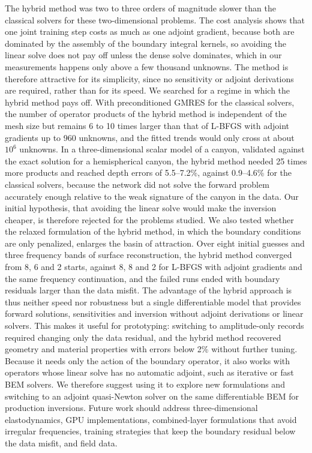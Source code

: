 \documentclass[11pt,twoside]{article}
\begin{document}
The hybrid method was two to three orders of magnitude slower than the classical solvers for these two-dimensional problems. The cost analysis shows that one joint training step costs as much as one adjoint gradient, because both are dominated by the assembly of the boundary integral kernels, so avoiding the linear solve does not pay off unless the dense solve dominates, which in our measurements happens only above a few thousand unknowns. The method is therefore attractive for its simplicity, since no sensitivity or adjoint derivations are required, rather than for its speed. We searched for a regime in which the hybrid method pays off. With preconditioned GMRES for the classical solvers, the number of operator products of the hybrid method is independent of the mesh size but remains 6 to 10 times larger than that of L-BFGS with adjoint gradients up to 960 unknowns, and the fitted trends would only cross at about $10^6$ unknowns. In a three-dimensional scalar model of a canyon, validated against the exact solution for a hemispherical canyon, the hybrid method needed 25 times more products and reached depth errors of 5.5--7.2\%, against 0.9--4.6\% for the classical solvers, because the network did not solve the forward problem accurately enough relative to the weak signature of the canyon in the data. Our initial hypothesis, that avoiding the linear solve would make the inversion cheaper, is therefore rejected for the problems studied. We also tested whether the relaxed formulation of the hybrid method, in which the boundary conditions are only penalized, enlarges the basin of attraction. Over eight initial guesses and three frequency bands of surface reconstruction, the hybrid method converged from 8, 6 and 2 starts, against 8, 8 and 2 for L-BFGS with adjoint gradients and the same frequency continuation, and the failed runs ended with boundary residuals larger than the data misfit. The advantage of the hybrid approach is thus neither speed nor robustness but a single differentiable model that provides forward solutions, sensitivities and inversion without adjoint derivations or linear solvers. This makes it useful for prototyping: switching to amplitude-only records required changing only the data residual, and the hybrid method recovered geometry and material properties with errors below 2\% without further tuning. Because it needs only the action of the boundary operator, it also works with operators whose linear solve has no automatic adjoint, such as iterative or fast BEM solvers. We therefore suggest using it to explore new formulations and switching to an adjoint quasi-Newton solver on the same differentiable BEM for production inversions. Future work should address three-dimensional elastodynamics, GPU implementations, combined-layer formulations that avoid irregular frequencies, training strategies that keep the boundary residual below the data misfit, and field data.
\end{document}
